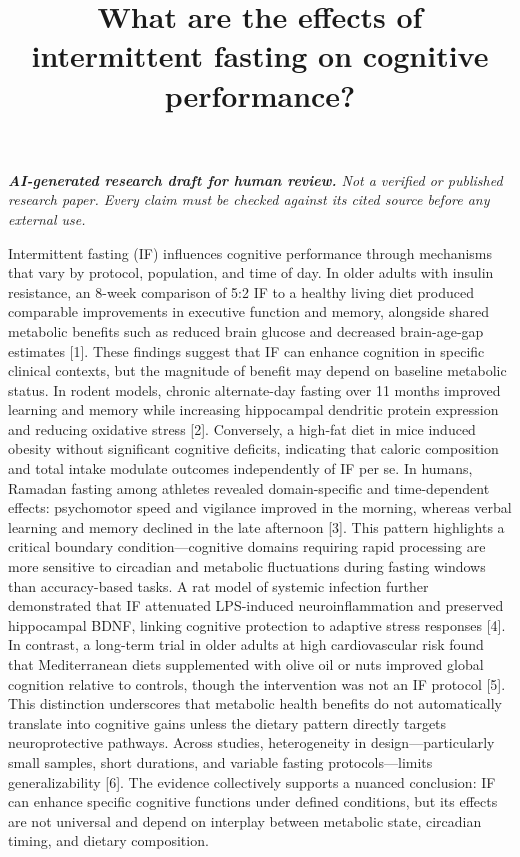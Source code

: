 \documentclass[11pt]{article}
\title{What are the effects of intermittent fasting on cognitive performance?}
\date{}
\begin{document}
\maketitle
\textit{\textbf{AI-generated research draft for human review.} Not a verified or published research paper. Every claim must be checked against its cited source before any external use.}\par

Intermittent fasting (IF) influences cognitive performance through mechanisms that vary by protocol, population, and time of day. In older adults with insulin resistance, an 8-week comparison of 5:2 IF to a healthy living diet produced comparable improvements in executive function and memory, alongside shared metabolic benefits such as reduced brain glucose and decreased brain-age-gap estimates [1]. These findings suggest that IF can enhance cognition in specific clinical contexts, but the magnitude of benefit may depend on baseline metabolic status. In rodent models, chronic alternate-day fasting over 11 months improved learning and memory while increasing hippocampal dendritic protein expression and reducing oxidative stress [2]. Conversely, a high-fat diet in mice induced obesity without significant cognitive deficits, indicating that caloric composition and total intake modulate outcomes independently of IF per se. In humans, Ramadan fasting among athletes revealed domain-specific and time-dependent effects: psychomotor speed and vigilance improved in the morning, whereas verbal learning and memory declined in the late afternoon [3]. This pattern highlights a critical boundary condition—cognitive domains requiring rapid processing are more sensitive to circadian and metabolic fluctuations during fasting windows than accuracy-based tasks. A rat model of systemic infection further demonstrated that IF attenuated LPS-induced neuroinflammation and preserved hippocampal BDNF, linking cognitive protection to adaptive stress responses [4]. In contrast, a long-term trial in older adults at high cardiovascular risk found that Mediterranean diets supplemented with olive oil or nuts improved global cognition relative to controls, though the intervention was not an IF protocol [5]. This distinction underscores that metabolic health benefits do not automatically translate into cognitive gains unless the dietary pattern directly targets neuroprotective pathways. Across studies, heterogeneity in design—particularly small samples, short durations, and variable fasting protocols—limits generalizability [6]. The evidence collectively supports a nuanced conclusion: IF can enhance specific cognitive functions under defined conditions, but its effects are not universal and depend on interplay between metabolic state, circadian timing, and dietary composition.
\end{document}
